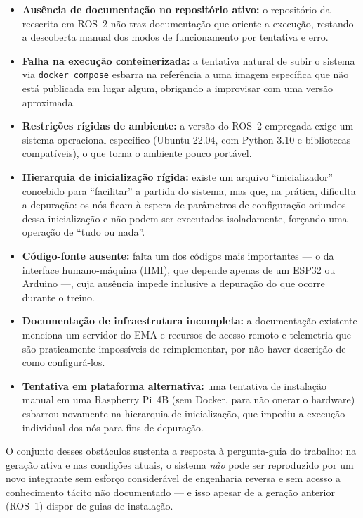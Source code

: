 \begin{itemize}
	\item \textbf{Ausência de documentação no repositório ativo:} o repositório da reescrita
	      em ROS~2 não traz documentação que oriente a execução, restando a descoberta manual
	      dos modos de funcionamento por tentativa e erro.
	\item \textbf{Falha na execução conteinerizada:} a tentativa natural de subir o sistema
	      via \texttt{docker compose} esbarra na referência a uma imagem específica que não
	      está publicada em lugar algum, obrigando a improvisar com uma versão aproximada.
	\item \textbf{Restrições rígidas de ambiente:} a versão do ROS~2 empregada exige um
	      sistema operacional específico (Ubuntu 22.04, com Python 3.10 e bibliotecas
	      compatíveis), o que torna o ambiente pouco portável.
	\item \textbf{Hierarquia de inicialização rígida:} existe um arquivo ``inicializador''
	      concebido para ``facilitar'' a partida do sistema, mas que, na prática, dificulta
	      a depuração: os nós ficam à espera de parâmetros de configuração oriundos dessa
	      inicialização e não podem ser executados isoladamente, forçando uma operação de
	      ``tudo ou nada''.
	\item \textbf{Código-fonte ausente:} falta um dos códigos mais importantes ---
	      o da interface humano-máquina (HMI), que depende apenas de um ESP32 ou Arduino ---,
	      cuja ausência impede inclusive a depuração do que ocorre durante o treino.
	\item \textbf{Documentação de infraestrutura incompleta:} a documentação existente
	      menciona um servidor do EMA e recursos de acesso remoto e telemetria que são
	      praticamente impossíveis de reimplementar, por não haver descrição de como
	      configurá-los.
	\item \textbf{Tentativa em plataforma alternativa:} uma tentativa de instalação manual
	      em uma Raspberry Pi~4B (sem Docker, para não onerar o hardware) esbarrou novamente
	      na hierarquia de inicialização, que impediu a execução individual dos nós para fins
	      de depuração.
\end{itemize}

O conjunto desses obstáculos sustenta a resposta à pergunta-guia do trabalho: na geração
ativa e nas condições atuais, o sistema \emph{não} pode ser reproduzido por um novo
integrante sem esforço considerável de engenharia reversa e sem acesso a conhecimento tácito
não documentado --- e isso apesar de a geração anterior (ROS~1) dispor de guias de
instalação.

